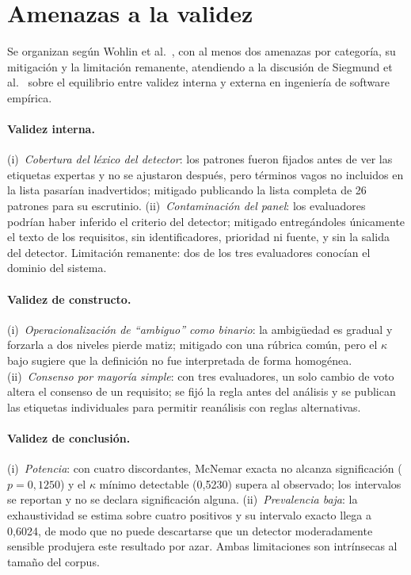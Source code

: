 \documentclass[runningheads]{llncs}
\begin{document}
\section{Amenazas a la validez}
\label{sec:threats}

Se organizan según Wohlin et al.~\cite{wohlin2012}, con al menos dos amenazas
por categoría, su mitigación y la limitación remanente, atendiendo a la
discusión de Siegmund et al.~\cite{siegmund2015validity} sobre el equilibrio
entre validez interna y externa en ingeniería de software empírica.

\paragraph{Validez interna.}
(i)~\textit{Cobertura del léxico del detector}: los patrones fueron fijados
antes de ver las etiquetas expertas y no se ajustaron después, pero términos
vagos no incluidos en la lista pasarían inadvertidos; mitigado publicando la
lista completa de 26 patrones para su escrutinio.
(ii)~\textit{Contaminación del panel}: los evaluadores podrían haber inferido el
criterio del detector; mitigado entregándoles únicamente el texto de los
requisitos, sin identificadores, prioridad ni fuente, y sin la salida del
detector. Limitación remanente: dos de los tres evaluadores conocían el dominio
del sistema.

\paragraph{Validez de constructo.}
(i)~\textit{Operacionalización de ``ambiguo'' como binario}: la ambigüedad es
gradual y forzarla a dos niveles pierde matiz; mitigado con una rúbrica común,
pero el $\kappa$ bajo sugiere que la definición no fue interpretada de forma
homogénea.
(ii)~\textit{Consenso por mayoría simple}: con tres evaluadores, un solo cambio
de voto altera el consenso de un requisito; se fijó la regla antes del análisis
y se publican las etiquetas individuales para permitir reanálisis con reglas
alternativas.

\paragraph{Validez de conclusión.}
(i)~\textit{Potencia}: con cuatro discordantes, McNemar exacta no alcanza
significación ($p = 0{,}1250$) y el $\kappa$ mínimo detectable (0,5230) supera
al observado; los intervalos se reportan y no se declara significación alguna.
(ii)~\textit{Prevalencia baja}: la exhaustividad se estima sobre cuatro
positivos y su intervalo exacto llega a 0,6024, de modo que no puede
descartarse que un detector moderadamente sensible produjera este resultado por
azar. Ambas limitaciones son intrínsecas al tamaño del corpus.
\end{document}
